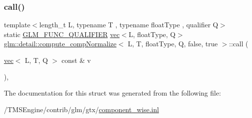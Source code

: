 \subsubsection{\texorpdfstring{call()}{call()}}
{\footnotesize\ttfamily template$<$length\+\_\+t L, typename T , typename float\+Type , qualifier Q$>$ \\
static \hyperlink{setup_8hpp_a33fdea6f91c5f834105f7415e2a64407}{G\+L\+M\+\_\+\+F\+U\+N\+C\+\_\+\+Q\+U\+A\+L\+I\+F\+I\+ER} \hyperlink{structglm_1_1vec}{vec}$<$L, float\+Type, Q$>$ \hyperlink{structglm_1_1detail_1_1compute__comp_normalize}{glm\+::detail\+::compute\+\_\+comp\+Normalize}$<$ L, T, float\+Type, Q, false, true $>$\+::call (\begin{DoxyParamCaption}\item[{\hyperlink{structglm_1_1vec}{vec}$<$ L, T, Q $>$ const \&}]{v }\end{DoxyParamCaption})\hspace{0.3cm}{\ttfamily [inline]}, {\ttfamily [static]}}



The documentation for this struct was generated from the following file\+:\begin{DoxyCompactItemize}
\item 
/\+T\+M\+S\+Engine/contrib/glm/gtx/\hyperlink{component__wise_8inl}{component\+\_\+wise.\+inl}\end{DoxyCompactItemize}
